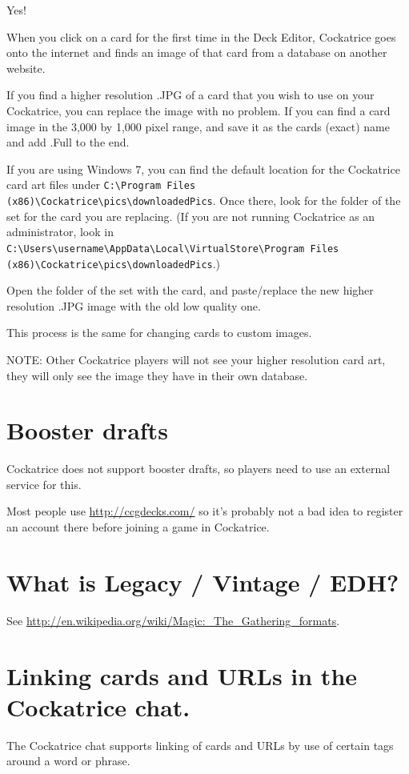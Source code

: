 \documentclass[a4paper]{scrbook}
\newcommand{\shellcmd}[1]{\texttt{\scriptsize #1}}
\begin{document}
Yes!

When you click on a card for the first time in the Deck Editor, Cockatrice goes onto the internet and finds an image of that card from a database on another website.

If you find a higher resolution .JPG of a card that you wish to use on your Cockatrice, you can replace the image with no problem. If you can find a card image in the 3,000 by 1,000 pixel range, and save it as the cards (exact) name and add .Full to the end.

If you are using Windows 7, you can find the default location for the Cockatrice card art files under \shellcmd{C:\textbackslash Program Files (x86)\textbackslash Cockatrice\textbackslash pics\textbackslash downloadedPics}. Once there, look for the folder of the set for the card you are replacing. (If you are not running Cockatrice as an administrator, look in \shellcmd{C:\textbackslash Users\textbackslash username\textbackslash AppData\textbackslash Local\textbackslash VirtualStore\textbackslash Program Files (x86)\textbackslash Cockatrice\textbackslash pics\textbackslash downloadedPics}.)

Open the folder of the set with the card, and paste/replace the new higher resolution .JPG image with the old low quality one.

This process is the same for changing cards to custom images.

NOTE: Other Cockatrice players will not see your higher resolution card art, they will only see the image they have in their own database.

\section{Booster drafts}
 Cockatrice does not support booster drafts, so players need to use an external service for this.

Most people use \url{http://ccgdecks.com/} so it's probably not a bad idea to register an account there before joining a game in Cockatrice. 

\section{What is Legacy / Vintage / EDH?}
See \url{http://en.wikipedia.org/wiki/Magic:_The_Gathering_formats}.

\section{Linking cards and URLs in the Cockatrice chat.}
The Cockatrice chat supports linking of cards and URLs by use of certain tags around a word or phrase.
\end{document}
